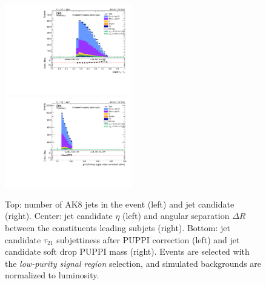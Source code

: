 \begin{figure}[!htb]
\begin{center}
    \includegraphics[width=0.495\textwidth]{plots/v9_U/XVZnnlpSR/FatJet1_puppiTau21.pdf}
    \includegraphics[width=0.495\textwidth]{plots/v9_U/XVZnnlpSR/FatJet1_softdropPuppiMassCorr.pdf}

    \caption{Top: number of AK8 jets in the event (left) and \V jet candidate \pt (right). Center: \V jet candidate $\eta$ (left) and angular separation $\Delta R$ between the constituents leading subjets (right). Bottom: \V jet candidate $\tau_{21}$ subjettiness after PUPPI correction (left) and \V jet candidate soft drop PUPPI mass (right). Events are selected with the \emph{low-purity signal region} selection, and simulated backgrounds are normalized to luminosity.}
  \end{center}
\end{figure}

\clearpage

